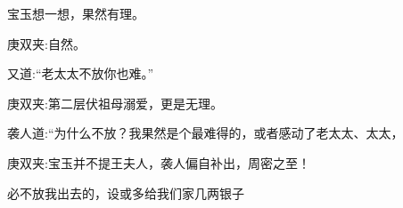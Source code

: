 \begin{parag}
    宝玉想一想，果然有理。\begin{note}庚双夹:自然。\end{note}又道:“老太太不放你也难。”\begin{note}庚双夹:第二层伏祖母溺爱，更是无理。\end{note}袭人道:“为什么不放？我果然是个最难得的，或者感动了老太太、太太，\begin{note}庚双夹:宝玉并不提王夫人，袭人偏自补出，周密之至！\end{note}必不放我出去的，设或多给我们家几两银子
\end{parag}
